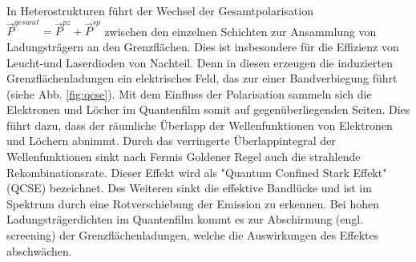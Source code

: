 In Heterostrukturen führt der Wechsel der Gesamtpolarisation $\vec{P}^{gesamt} = \vec{P}^{pz} + \vec{P}^{sp}$ zwischen den einzelnen Schichten zur Ansammlung von Ladungsträgern an den Grenzflächen. Dies ist insbesondere für die Effizienz von Leucht-und Laserdioden von Nachteil. Denn in diesen erzeugen die induzierten Grenzflächenladungen ein elektrisches Feld, das zur einer Bandverbiegung führt (siehe Abb. \ref{fig:qcse}). Mit dem Einfluss der Polarisation sammeln sich die Elektronen und Löcher im Quantenfilm somit auf gegenüberliegenden Seiten. Dies führt dazu, dass der räumliche Überlapp der Wellenfunktionen von Elektronen und Löchern abnimmt. Durch das verringerte Überlappintegral der Wellenfunktionen sinkt nach Fermis Goldener Regel auch die strahlende Rekombinationsrate. Dieser Effekt wird als "Quantum Confined Stark Effekt"  (QCSE) bezeichnet. Des Weiteren sinkt die effektive Bandlücke und ist im Spektrum durch eine Rotverschiebung der Emission zu erkennen. Bei hohen Ladungsträgerdichten im Quantenfilm kommt es zur Abschirmung (engl. screening) der Grenzflächenladungen, welche die Auswirkungen des Effektes abschwächen.
